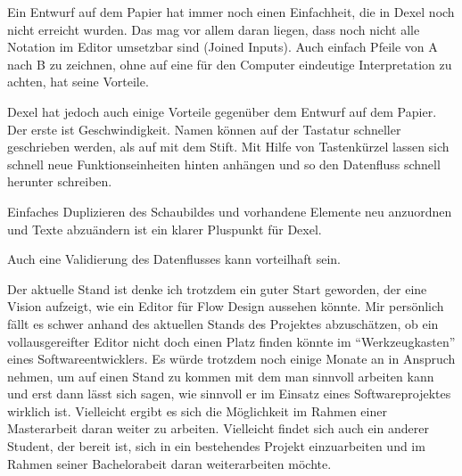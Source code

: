 Ein Entwurf auf dem Papier hat immer noch einen Einfachheit, die in Dexel noch nicht erreicht wurden.
Das mag vor allem daran liegen, dass noch nicht alle Notation im Editor umsetzbar sind (Joined Inputs). 
Auch einfach Pfeile von A nach B zu zeichnen, ohne auf eine für den Computer eindeutige Interpretation zu achten, hat seine Vorteile.

Dexel hat jedoch auch einige Vorteile gegenüber dem Entwurf auf dem Papier. Der erste ist Geschwindigkeit. 
Namen können auf der Tastatur schneller geschrieben werden, als auf mit dem Stift. Mit Hilfe von Tastenkürzel lassen sich schnell neue Funktionseinheiten hinten anhängen und so den Datenfluss schnell herunter schreiben.

Einfaches Duplizieren des Schaubildes und vorhandene Elemente neu anzuordnen und Texte abzuändern ist ein klarer Pluspunkt für Dexel.

Auch eine Validierung des Datenflusses kann vorteilhaft sein.



Der aktuelle Stand ist denke ich trotzdem ein guter Start geworden, der eine Vision aufzeigt, wie ein Editor für Flow Design aussehen könnte.
Mir persönlich fällt es schwer anhand des aktuellen Stands des Projektes abzuschätzen, ob ein vollausgereifter Editor nicht doch einen  Platz finden könnte im \enquote{Werkzeugkasten} eines Softwareentwicklers.
 Es würde trotzdem noch einige Monate an in Anspruch nehmen,  um auf einen Stand zu kommen mit dem man sinnvoll arbeiten kann und erst dann lässt sich sagen, wie sinnvoll er im Einsatz eines Softwareprojektes wirklich ist.
  Vielleicht ergibt es sich die Möglichkeit im Rahmen einer Masterarbeit daran weiter zu arbeiten. Vielleicht findet sich auch ein anderer Student, der bereit ist, sich in ein bestehendes Projekt einzuarbeiten und im Rahmen seiner Bachelorabeit daran weiterarbeiten möchte.



